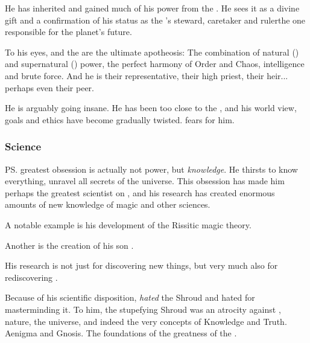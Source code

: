 He has inherited and gained much of his power from the \firstgendragons. He sees it as a divine gift and a confirmation of his status as the \Miith{}'s steward, caretaker and ruler\dash the one responsible for the planet's future. 

To his eyes, \Tiamat{} and the \firstgendragons{} are the ultimate apotheosis: The combination of natural (\ophidian) and supernatural (\xzaishannic) power, the perfect harmony of Order and Chaos, intelligence and brute force. And he is their representative, their high priest, their heir... perhaps even their peer. 


He is arguably going insane. 
He has been too close to the \xss, and his world view, goals and ethics have become gradually twisted. 
\Nzessuacrith{} fears for him. 





\subsubsection{Science}
\ps{\Secherdamon} greatest obsession is actually not power, but \emph{knowledge}. He thirsts to know everything, unravel all secrets of the universe. This obsession has made him perhaps the greatest scientist on \Miith{}, and his research has created enormous amounts of new knowledge of magic and other sciences. 

A notable example is his development of the Rissitic magic theory. 

Another is the creation of his son .

His research is not just for discovering new things, but very much also for rediscovering . 

Because of his scientific disposition, \Secherdamon{} \emph{hated} the Shroud and hated \Ishnaruchaefir{} for masterminding it. 
To him, the stupefying Shroud was an atrocity against \Miith, nature, the universe, and indeed the very concepts of Knowledge and Truth. 
Aenigma and Gnosis. 
The foundations of the greatness of the \dzraicchenosses. 





